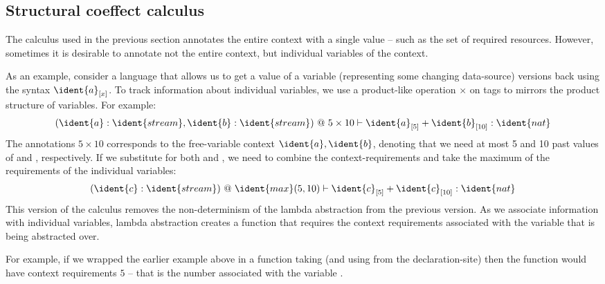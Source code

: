 
\subsection{Structural coeffect calculus}

\newcommand{\pastval}[2]{\ident{#1}_{[#2]}}
\newcommand{\dnat}{\ident{stream}}

The calculus used in the previous section annotates the entire context with a single value --  such
as the set of required resources. However, sometimes it is desirable to annotate not the entire 
context, but individual variables of the context.

As an example, consider a language that allows us to get a value of a variable (representing
some changing data-source)  versions back using the syntax $\pastval{a}{x}$. 
To track information about individual variables, we use a product-like operation $\times$ on tags 
to mirrors the product structure of variables. For example:
%
\begin{equation*}
\begin{array}{l}
(\ident{a}:\dnat, \ident{b}:\dnat) ~@~ 5 \times 10
  \vdash
    \pastval{a}{5}+\pastval{b}{10}: \ident{nat}
\end{array}
\end{equation*}
%
The annotations $5 \times 10$ corresponds to the free-variable context $\ident{a}, \ident{b}$, denoting
that we need at most 5 and 10 past values of  and , respectively. If we substitute 
 for both  and , we need to combine the context-requirements and take the
maximum of the requirements of the individual variables:
%
\begin{equation*}
\begin{array}{l}
(\ident{c}:\dnat) ~@~ \ident{max}(5, 10)
  \vdash
    \pastval{c}{5}+\pastval{c}{10}: \ident{nat}
\end{array}
\end{equation*}
%
This version of the calculus removes the non-determinism of the lambda abstraction from the previous
version. As we associate information with individual variables, lambda abstraction creates a function
that requires the context requirements associated with the variable that is being abstracted over.

For example, if we wrapped the earlier example above in a function taking  (and using 
 from the declaration-site) then the function would have context requirements $5$ -- that
is the number associated with the variable .

